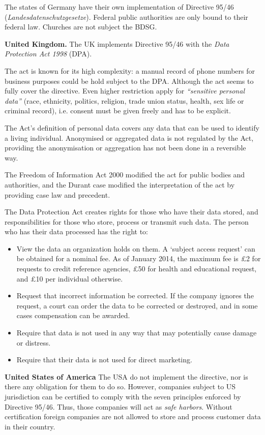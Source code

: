 The states of Germany have their own implementation of Directive 95/46 (\emph{Landesdatenschutzgesetze}).
Federal public authorities are only bound to their federal law.
Churches are not subject the BDSG.

\textbf{United Kingdom.} %
The UK implements Directive 95/46 with the \emph{Data Protection Act 1998} (DPA).

The act is known for its high complexity: a manual record of phone numbers for business purposes could be hold subject to the DPA.
Although the act seems to fully cover the directive.
Even higher restriction apply for \emph{``sensitive personal data''} (race, ethnicity, politics, religion, trade union status, health, sex life or criminal record), i.e. consent must be given freely and has to be explicit.

The Act's definition of personal data covers any data that can be used to identify a living individual.
Anonymised or aggregated data is not regulated by the Act, providing the anonymisation or aggregation has not been done in a reversible way.

The Freedom of Information Act 2000 modified the act for public bodies and authorities, and the Durant case modified the interpretation of the act by providing case law and precedent.

The Data Protection Act creates rights for those who have their data stored, and responsibilities for those who store, process or transmit such data.
The person who has their data processed has the right to:
\begin{itemize}
\item View the data an organization holds on them.
A `subject access request' can be obtained for a nominal fee.
As of January 2014, the maximum fee is \pounds2 for requests to credit reference agencies, \pounds50 for health and educational request, and \pounds10 per individual otherwise.
\item Request that incorrect information be corrected.
If the company ignores the request, a court can order the data to be corrected or destroyed, and in some cases compensation can be awarded.
\item Require that data is not used in any way that may potentially cause damage or distress.
\item Require that their data is not used for direct marketing. \cite{3}
\end{itemize}


\textbf{United States of America}
The USA do not implement the directive, nor is there any obligation for them to do so.
However, companies subject to US jurisdiction can be certified to comply with the seven principles enforced by Directive 95/46.
Thus, those companies will act as \emph{safe harbors}.
Without certification foreign companies are not allowed to store and process customer data in their country.



